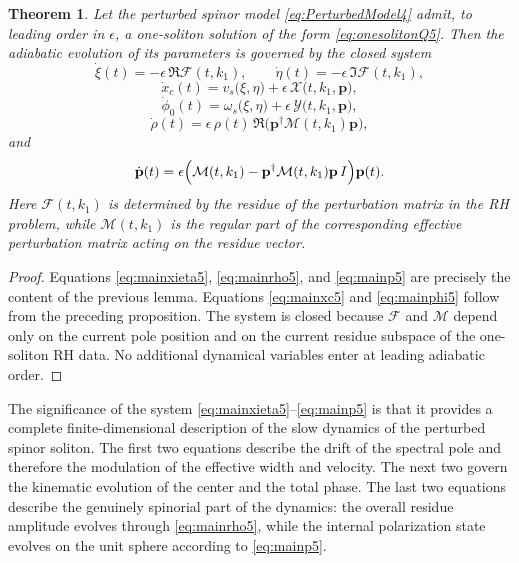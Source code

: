 \documentclass[11pt]{amsart}
\newtheorem{theorem}{Theorem}[section]
\theoremstyle{definition}
\numberwithin{equation}{section}
\begin{document}
\begin{theorem}
\label{thm_6_1}
Let the perturbed spinor model \eqref{eq:PerturbedModel4} admit, to leading order in $\epsilon$, a one-soliton solution of the form \eqref{eq:onesolitonQ5}. Then the adiabatic evolution of its parameters is governed by the closed system
\begin{equation}
\dot{\xi}(t)=-\epsilon\,\Re \mathcal F(t,k_1),
\qquad
\dot{\eta}(t)=-\epsilon\,\Im \mathcal F(t,k_1),
\label{eq:mainxieta5}
\end{equation}
\begin{equation}
\dot{x}_c(t)=v_s\bigl(\xi,\eta\bigr)+\epsilon\,\mathcal X\bigl(t,k_1,\mathbf p\bigr),
\label{eq:mainxc5}
\end{equation}
\begin{equation}
\dot{\phi}_0(t)=\omega_s\bigl(\xi,\eta\bigr)+\epsilon\,\mathcal Y\bigl(t,k_1,\mathbf p\bigr),
\label{eq:mainphi5}
\end{equation}
\begin{equation}
\dot{\rho}(t)=\epsilon\,\rho(t)\,\Re\bigl(\mathbf p^\dagger \mathcal M(t,k_1)\mathbf p\bigr),
\label{eq:mainrho5}
\end{equation}
and
\begin{equation}
\dot{\mathbf p}(t)
=
\epsilon\Bigl(
\mathcal M(t,k_1)-\mathbf p^\dagger \mathcal M(t,k_1)\mathbf p\,I
\Bigr)\mathbf p(t).
\label{eq:mainp5}
\end{equation}
Here $\mathcal F(t,k_1)$ is determined by the residue of the perturbation matrix in the RH problem, while $\mathcal M(t,k_1)$ is the regular part of the corresponding effective perturbation matrix acting on the residue vector.
\end{theorem}

\begin{proof}
Equations \eqref{eq:mainxieta5}, \eqref{eq:mainrho5}, and \eqref{eq:mainp5} are precisely the content of the previous lemma. Equations \eqref{eq:mainxc5} and \eqref{eq:mainphi5} follow from the preceding proposition. The system is closed because $\mathcal F$ and $\mathcal M$ depend only on the current pole position and on the current residue subspace of the one-soliton RH data. No additional dynamical variables enter at leading adiabatic order.
\end{proof}

The significance of the system \eqref{eq:mainxieta5}--\eqref{eq:mainp5} is that it provides a complete finite-dimensional description of the slow dynamics of the perturbed spinor soliton. The first two equations describe the drift of the spectral pole and therefore the modulation of the effective width and velocity. The next two govern the kinematic evolution of the center and the total phase. The last two equations describe the genuinely spinorial part of the dynamics: the overall residue amplitude evolves through \eqref{eq:mainrho5}, while the internal polarization state evolves on the unit sphere according to \eqref{eq:mainp5}.
\end{document}
